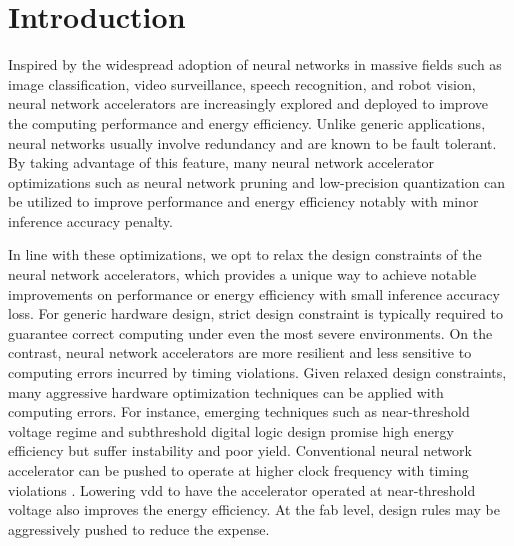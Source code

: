 \section{Introduction} \label{sec:intro}
Inspired by the widespread adoption of neural networks in massive fields such as image classification, 
video surveillance, speech recognition, and robot vision, neural network accelerators 
\cite{pipecnn_2,Zhang2015_9,Qiu2016_10,deepburing_12,Farabet2010_13,Zeng2018_18} 
are increasingly explored and deployed to improve the computing performance and energy efficiency.
Unlike generic applications, neural networks usually involve redundancy and are known to be 
fault tolerant\cite{Reagen2016}. By taking advantage of this feature, many neural network accelerator optimizations 
such as neural network pruning and low-precision quantization can be utilized to improve 
performance and energy efficiency notably with minor inference accuracy penalty\cite{Han2016DeepCC}. 

In line with these optimizations, we opt to relax the design constraints of 
the neural network accelerators, which provides a unique way to achieve notable 
improvements on performance or energy efficiency with small inference accuracy loss. 
For generic hardware design, strict design constraint is typically required to 
guarantee correct computing under even the most severe environments. On the contrast, 
neural network accelerators are more resilient and less sensitive to computing 
errors incurred by timing violations. Given relaxed design constraints, many 
aggressive hardware optimization techniques can be applied with computing errors. 
For instance, emerging techniques such as  near-threshold voltage regime\cite{RG2010NT} 
and subthreshold digital logic design\cite{BH2005,B2006} promise high energy efficiency 
but suffer instability and poor yield. Conventional neural network accelerator 
can be pushed to operate at higher clock frequency with timing violations
\cite{overclock_3,Paceline_15}.
Lowering vdd to have the accelerator operated at near-threshold voltage 
also improves the energy efficiency. At the fab level, design rules may 
be aggressively pushed to reduce the expense. 

